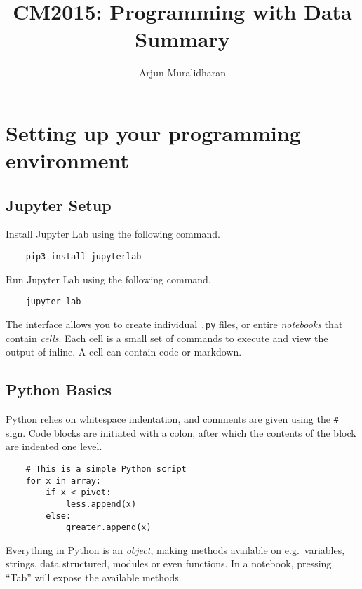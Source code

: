 
\title{CM2015: Programming with Data \\ Summary}
\author{Arjun Muralidharan}



\section{Setting up your programming environment}
\subsection{Jupyter Setup} %
\label{ssub:jupyter_setup}


Install Jupyter Lab using the following command.

\begin{verbatim}
	pip3 install jupyterlab
\end{verbatim}

Run Jupyter Lab using the following command.

\begin{verbatim}
	jupyter lab
\end{verbatim}

The interface allows you to create individual \texttt{.py} files, or entire \emph{notebooks} that contain \emph{cells}. Each cell is a small set of commands to execute and view the output of inline. A cell can contain code or markdown.

\subsection{Python Basics} %
\label{ssub:python_basics}

 Python relies on whitespace indentation, and comments are given using the \texttt{\#} sign. Code blocks are initiated with a colon, after which the contents of the block are indented one level.

 \begin{verbatim}
 	# This is a simple Python script
 	for x in array:
 		if x < pivot:
 			less.append(x)
		else:
			greater.append(x)
 \end{verbatim}

 Everything in Python is an \emph{object}, making methods available on e.g.\ variables, strings, data structured, modules or even functions. In a notebook, pressing ``Tab'' will expose the available methods.

